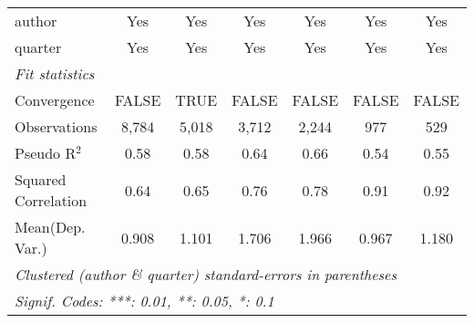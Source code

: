 \begin{tabular}{lcccccc}
   author                                                     & Yes           & Yes           & Yes          & Yes          & Yes           & Yes\\  
   quarter                                                    & Yes           & Yes           & Yes          & Yes          & Yes           & Yes\\  
   \midrule
   \emph{Fit statistics}\\
   Convergence                                                &FALSE          & TRUE          & FALSE        & FALSE        & FALSE         & FALSE\\  
   Observations                                               & 8,784         & 5,018         & 3,712        & 2,244        & 977           & 529\\  
   Pseudo R$^2$                                               & 0.58          & 0.58          & 0.64         & 0.66         & 0.54          & 0.55\\  
   Squared Correlation                                        & 0.64          & 0.65          & 0.76         & 0.78         & 0.91          & 0.92\\  
Mean(Dep. Var.) & 0.908 & 1.101 & 1.706 & 1.966 & 0.967 & 1.180 \\
   \midrule \midrule
   \multicolumn{7}{l}{\emph{Clustered (author \& quarter) standard-errors in parentheses}}\\
   \multicolumn{7}{l}{\emph{Signif. Codes: ***: 0.01, **: 0.05, *: 0.1}}\\
\end{tabular}
\par\endgroup
